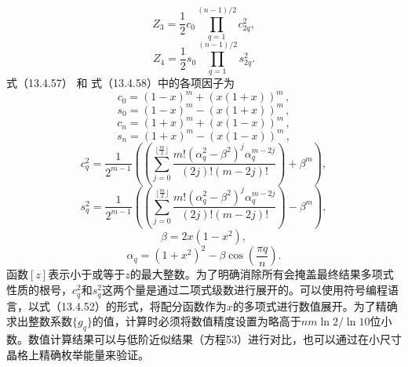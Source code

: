 \begin{equation}\tag{13.4.20}\label{eq:13.4.20}
Z _ { 3 } = \frac { 1 } { 2 } c _ { 0 } \prod _ { q = 1 } ^{( n - 1 ) / 2} c _ { 2 q } ^{2} ,
\end{equation}
\begin{equation}\tag{13.4.21}\label{eq:13.4.21}
Z _ { 4 } = \frac { 1 } { 2 } s _ { 0 } \prod _ { q = 1 } ^{( n - 1 ) / 2} s _ { 2 q } ^{2} .
\end{equation}
式（13.4.57） 和 式（13.4.58）中的各项因子为
\begin{equation}\tag{13.4.22}\label{eq:13.4.22}
c _ { 0 } = ( 1 - x ) ^{m} + ( x ( 1 + x ) ) ^{m} \, ,
\end{equation}
\begin{equation}\tag{13.4.23}\label{eq:13.4.23}
s _ { 0 } = ( 1 - x ) ^{m} - ( x ( 1 + x ) ) ^{m} \, ,
\end{equation}
\begin{equation}\tag{13.4.24}\label{eq:13.4.24}
c _ { n } = ( 1 + x ) ^{m} + ( x ( 1 - x ) ) ^{m} \, ,
\end{equation}
\begin{equation}\tag{13.4.25}\label{eq:13.4.25}
s _ { n } = ( 1 + x ) ^{m} - ( x ( 1 - x ) ) ^{m} \, ,
\end{equation}
\begin{equation}\tag{13.4.26}\label{eq:13.4.26}
c _ { q } ^{2} = \frac { 1 } { 2 ^{m - 1} } \left( \left( \sum _ { j = 0 } ^{\lfloor \frac { m} { 2 } \rfloor } \frac { m ! \left( \alpha _ { q } ^{2} - \beta ^{2} \right) ^{j} \alpha _ { q } ^{m - 2 j} } { ( 2 j ) ! ( m - 2 j ) ! } \right) + \beta ^{m} \right) ,
\end{equation}
\begin{equation}\tag{13.4.27}\label{eq:13.4.27}
s _ { q } ^{2} = \frac { 1 } { 2 ^{m - 1} } \left( \left( \sum _ { j = 0 } ^{\lfloor \frac { m} { 2 } \rfloor } \frac { m ! \left( \alpha _ { q } ^{2} - \beta ^{2} \right) ^{j} \alpha _ { q } ^{m - 2 j} } { ( 2 j ) ! ( m - 2 j ) ! } \right) - \beta ^{m} \right) ,
\end{equation}
\begin{equation}\tag{13.4.28}\label{eq:13.4.28}
\beta = 2 x ( 1 - x ^{2} ) ,
\end{equation}
\begin{equation}\tag{13.4.29}\label{eq:13.4.29}
\alpha _ { q } = ( 1 + x ^{2} ) ^{2} - \beta \cos \left( \frac { \pi q } { n } \right) .
\end{equation}
函数\([z]\)表示小于或等于\(z\)的最大整数。为了明确消除所有会掩盖最终结果多项式性质的根号，\(c_{q}^{2}\)和\(s_{q}^{2}\)这两个量是通过二项式级数进行展开的。可以使用符号编程语言，以式（13.4.52）的形式，将配分函数作为\(x\)的多项式进行数值展开。为了精确求出整数系数\(\{g_{q}\}\)的值，计算时必须将数值精度设置为略高于\(nm\ln2/\ln10\)位小数。数值计算结果可以与低阶近似结果（方程53）进行对比，也可以通过在小尺寸晶格上精确枚举能量来验证。
